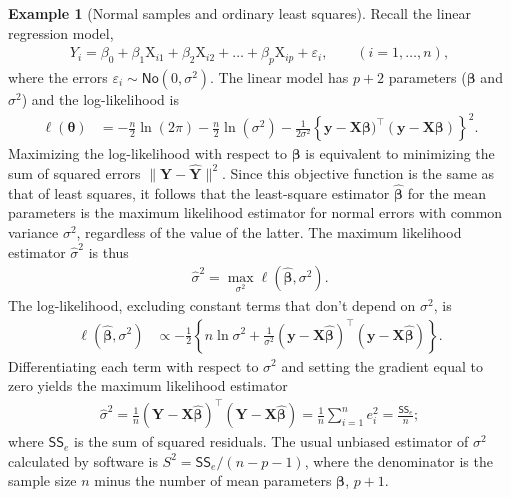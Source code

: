\documentclass[
  11pt,
  letterpaper,
]{book}
\theoremstyle{definition}
\theoremstyle{definition}
\newtheorem{example}{Example}[chapter]
\theoremstyle{definition}
\theoremstyle{remark}
\begin{document}
\begin{example}[Normal samples and ordinary least squares]
Recall the linear regression model,
\begin{align*}
Y_i=\beta_0+\beta_1 \mathrm{X}_{i1}+\beta_2 \mathrm{X}_{i2}+\ldots +\beta_p \mathrm{X}_{ip} + \varepsilon_i, \qquad  (i=1, \ldots, n),
\end{align*}
where the errors \(\varepsilon_i \sim \mathsf{No}(0, \sigma^2)\).
The linear model has \(p+2\) parameters (\(\boldsymbol{\beta}\) and \(\sigma^2\)) and the log-likelihood is
\begin{align*}
\ell(\boldsymbol{\theta})&=-\frac{n}{2} \ln(2\pi)-\frac{n}{2} \ln (\sigma^2) -\frac{1}{2\sigma^2}\left\{\boldsymbol{y}-\mathbf{X}\boldsymbol{\beta})^\top(\boldsymbol{y}-\mathbf{X}\boldsymbol{\beta})\right\}^2.
\end{align*}
Maximizing the log-likelihood with respect to \(\boldsymbol{\beta}\) is equivalent to
minimizing the sum of squared errors \(\|\boldsymbol{Y} - \widehat{\boldsymbol{Y}}\|^2\). Since this objective function is the same as that of least squares, it follows that the least-square estimator \(\widehat{\boldsymbol{\beta}}\) for the mean parameters is the maximum likelihood estimator for normal errors with common variance \(\sigma^2\), regardless of the value of the latter. The maximum likelihood estimator \(\widehat{\sigma}^2\) is thus
\begin{align*}
\hat{\sigma}^2=\max_{\sigma^2} \ell(\widehat{\boldsymbol{\beta}}, \sigma^2).
\end{align*}
The log-likelihood, excluding constant terms that don't depend on \(\sigma^2\), is
\begin{align*}
\ell(\widehat{\boldsymbol{\beta}}, \sigma^2)
&\propto-\frac{1}{2}\left\{n\ln\sigma^2+\frac{1}{\sigma^2}(\boldsymbol{y}-\mathbf{X}\hat{\boldsymbol{\beta}})^\top(\boldsymbol{y}-\mathbf{X}\hat{\boldsymbol{\beta}})\right\}.
\end{align*}
Differentiating each term with respect to \(\sigma^2\) and setting the gradient equal to zero yields the maximum likelihood estimator
\begin{align*}
\hat{\sigma}^2=\frac{1}{n}(\boldsymbol{Y}-\mathbf{X}\hat{\boldsymbol{\beta}})^\top(\boldsymbol{Y}-\mathbf{X}\hat{\boldsymbol{\beta}})= \frac{1}{n} \sum_{i=1}^n e_i^2= \frac{\mathsf{SS}_e}{n};
\end{align*}
where \(\mathsf{SS}_e\) is the sum of squared residuals. The usual unbiased estimator of \(\sigma^2\) calculated by software is \(S^2=\mathsf{SS}_e/(n-p-1)\), where the denominator is the sample size \(n\) minus the number of mean parameters \(\boldsymbol{\beta}\), \(p+1\).
\end{example}
\end{document}
